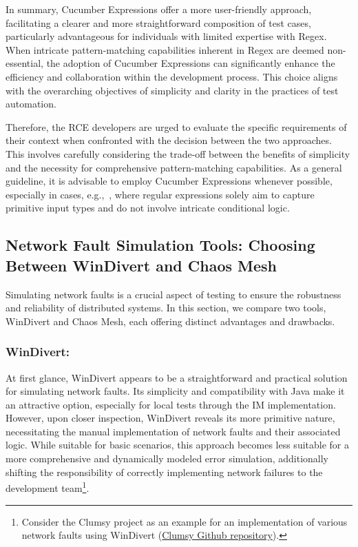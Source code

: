 In summary, Cucumber Expressions offer a more user-friendly approach, facilitating a clearer and more straightforward composition of test cases, particularly advantageous for individuals with limited expertise with Regex. When intricate pattern-matching capabilities inherent in Regex are deemed non-essential, the adoption of Cucumber Expressions can significantly enhance the efficiency and collaboration within the development process. This choice aligns with the overarching objectives of simplicity and clarity in the practices of test automation.

Therefore, the \ac{RCE} developers are urged to evaluate the specific requirements of their context when confronted with the decision between the two approaches. This involves carefully considering the trade-off between the benefits of simplicity and the necessity for comprehensive pattern-matching capabilities. As a general guideline, it is advisable to employ Cucumber Expressions whenever possible, especially in cases, e.g.,~, where regular expressions solely aim to capture primitive input types and do not involve intricate conditional logic.

\subsection{Network Fault Simulation Tools: Choosing Between WinDivert and Chaos Mesh}
\label{subsec:network-fault-wdiviert-chaos-mesh}
Simulating network faults is a crucial aspect of testing to ensure the robustness and reliability of distributed systems. In this section, we compare two tools, WinDivert and Chaos Mesh, each offering distinct advantages and drawbacks.

\subsubsection{WinDivert:}
At first glance, WinDivert appears to be a straightforward and practical solution for simulating network faults. Its simplicity and compatibility with Java make it an attractive option, especially for local tests through the \ac{IM} implementation. However, upon closer inspection, WinDivert reveals its more primitive nature, necessitating the manual implementation of network faults and their associated logic. While suitable for basic scenarios, this approach becomes less suitable for a more comprehensive and dynamically modeled error simulation, additionally shifting the responsibility of correctly implementing network failures to the development team\footnote{Consider the Clumsy project as an example for an implementation of various network faults using WinDivert (\href{https://github.com/jagt/clumsy}{Clumsy Github repository}).}.

